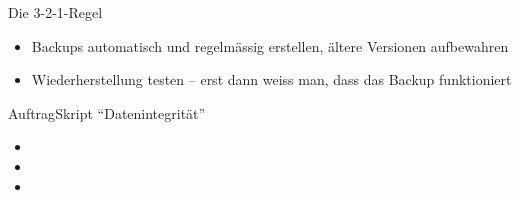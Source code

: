 \begin{frame}{Die 3-2-1-Regel}
    \begin{center}
        \resizebox{.95\textwidth}{!}{}
    \end{center}
    \begin{itemize}
        \item Backups automatisch und regelmässig erstellen, ältere Versionen aufbewahren
        \item Wiederherstellung testen -- erst dann weiss man, dass das Backup funktioniert
    \end{itemize}
\end{frame}

\begin{frame}{Auftrag}{Skript \enquote{Datenintegrität}}
    \begin{itemize}
        \item {}
        \item {}
        \item {}
    \end{itemize}
\end{frame}